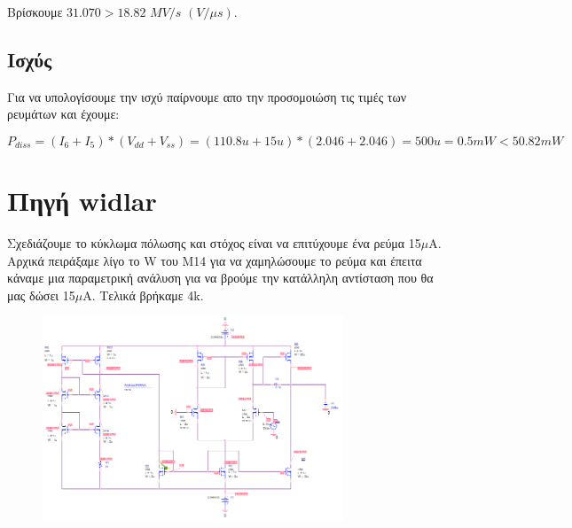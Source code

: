 \documentclass[12pt, a4paper]{article}
\begin{document}
Βρίσκουμε $31.070 > 18.82$ $MV/s$ $(V/\mu s)$. 




\subsection{Ισχύς}

Για να υπολογίσουμε την ισχύ παίρνουμε απο την προσομοιώση τις τιμές των ρευμάτων και έχουμε:

\[ P_{diss} =  (I_6 + I_5) * (V_{dd} + V_{ss}) = (110.8u + 15u) * (2.046 + 2.046) = 500u = 0.5 mW < 50.82 mW\]

\pagebreak

\section{Πηγή widlar}

Σχεδιάζουμε το κύκλωμα πόλωσης και στόχος είναι να επιτύχουμε ένα ρεύμα 15$\mu$A. Αρχικά πειράξαμε λίγο το W του Μ14 για να χαμηλώσουμε το ρεύμα και έπειτα κάναμε μια παραμετρική ανάλυση για να βρούμε την κατάλληλη αντίσταση που θα μας δώσει 15$\mu$A. Τελικά βρήκαμε 4k.

\begin{figure}[h!]
	\centering
	\includegraphics[width = 0.8\textwidth, height = .3\textheight, keepaspectratio]{assets/widlar_circuit.png}
\end{figure}
\end{document}
